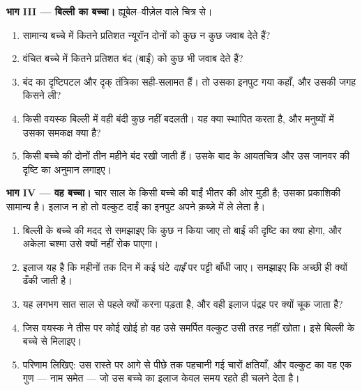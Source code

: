 \begin{problem}
\medskip
\noindent\textbf{भाग III --- बिल्ली का बच्चा।}
ह्यूबेल--वीज़ेल वाले चित्र से।
\begin{enumerate}[resume]
  \item सामान्य बच्चे में कितने प्रतिशत न्यूरॉन दोनों  को कुछ न कुछ
        जवाब देते हैं?
  \item वंचित बच्चे में कितने प्रतिशत बंद (बाईं)  को कुछ भी जवाब देते
        हैं?
  \item बंद  का दृष्टिपटल और दृक् तंत्रिका सही-सलामत हैं। तो उसका इनपुट
        गया कहाँ, और उसकी जगह किसने ली?
  \item किसी वयस्क बिल्ली में वही बंदी कुछ नहीं बदलती। यह क्या स्थापित
        करता है, और मनुष्यों में उसका समकक्ष क्या है?
  \item किसी बच्चे की दोनों  तीन महीने बंद रखी जाती हैं। उसके बाद के
        आयतचित्र और उस जानवर की दृष्टि का अनुमान लगाइए।
\end{enumerate}

\medskip
\noindent\textbf{भाग IV --- वह बच्चा।}
चार साल के किसी बच्चे की बाईं  भीतर की ओर मुड़ी है; उसका प्रकाशिकी
सामान्य है। इलाज न हो तो वल्कुट दाईं  का इनपुट अपने क़ब्ज़े में ले लेता
है।
\begin{enumerate}[resume]
  \item बिल्ली के बच्चे की मदद से समझाइए कि कुछ न किया जाए तो बाईं  की
        दृष्टि का क्या होगा, और अकेला चश्मा उसे क्यों नहीं रोक पाएगा।
  \item इलाज यह है कि महीनों तक दिन में कई घंटे \emph{दाईं}  पर पट्टी
        बाँधी जाए। समझाइए कि अच्छी  ही क्यों ढँकी जाती है।
  \item यह लगभग सात साल से पहले क्यों करना पड़ता है, और वही इलाज पंद्रह पर
        क्यों चूक जाता है?
  \item जिस वयस्क ने तीस पर कोई  खोई हो वह उसे समर्पित वल्कुट उसी तरह
        नहीं खोता। इसे बिल्ली के बच्चे से मिलाइए।
  \item परिणाम लिखिए: उस रास्ते पर आगे से पीछे तक पहचानी गई चारों क्षतियाँ,
        और वल्कुट का वह एक गुण --- नाम समेत --- जो उस बच्चे का इलाज केवल
        समय रहते ही चलने देता है।
\end{enumerate}
\end{problem}
